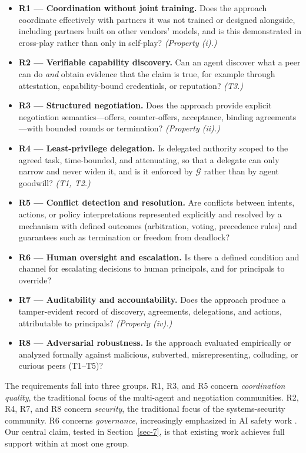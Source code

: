 \documentclass[conference]{IEEEtran}
\providecommand{\tightlist}{\setlength{\itemsep}{0pt}\setlength{\parskip}{0pt}}
\begin{document}
\begin{itemize}
\tightlist
\item
  \textbf{R1 --- Coordination without joint training.} Does the approach coordinate effectively with partners it was not trained or designed alongside, including partners built on other vendors' models, and is this demonstrated in cross-play rather than only in self-play? \emph{(Property (i).)}
\item
  \textbf{R2 --- Verifiable capability discovery.} Can an agent discover what a peer can do \emph{and} obtain evidence that the claim is true, for example through attestation, capability-bound credentials, or reputation? \emph{(T3.)}
\item
  \textbf{R3 --- Structured negotiation.} Does the approach provide explicit negotiation semantics---offers, counter-offers, acceptance, binding agreements---with bounded rounds or termination? \emph{(Property (ii).)}
\item
  \textbf{R4 --- Least-privilege delegation.} Is delegated authority scoped to the agreed task, time-bounded, and attenuating, so that a delegate can only narrow and never widen it, and is it enforced by \(\mathcal{G}\) rather than by agent goodwill? \emph{(T1, T2.)}
\item
  \textbf{R5 --- Conflict detection and resolution.} Are conflicts between intents, actions, or policy interpretations represented explicitly and resolved by a mechanism with defined outcomes (arbitration, voting, precedence rules) and guarantees such as termination or freedom from deadlock?
\item
  \textbf{R6 --- Human oversight and escalation.} Is there a defined condition and channel for escalating decisions to human principals, and for principals to override?
\item
  \textbf{R7 --- Auditability and accountability.} Does the approach produce a tamper-evident record of discovery, agreements, delegations, and actions, attributable to principals? \emph{(Property (iv).)}
\item
  \textbf{R8 --- Adversarial robustness.} Is the approach evaluated empirically or analyzed formally against malicious, subverted, misrepresenting, colluding, or curious peers (T1--T5)?
\end{itemize}

The requirements fall into three groups. R1, R3, and R5 concern \emph{coordination quality}, the traditional focus of the multi-agent and negotiation communities. R2, R4, R7, and R8 concern \emph{security}, the traditional focus of the systems-security community. R6 concerns \emph{governance}, increasingly emphasized in AI safety work \cite{hammond2025multiagent, tomasev2026intelligent}. Our central claim, tested in Section~\ref{sec-7}, is that existing work achieves full support within at most one group.
\end{document}
